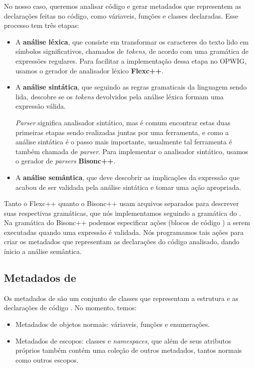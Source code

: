   No nosso caso, queremos analisar código \CXX{} e gerar metadados que representem as declarações feitas no
  código, como váriaveis, funções e classes declaradas. Esse processo tem três etapas:
  \begin{itemize}
    \item A \textbf{análise léxica}, que consiste em transformar os caracteres do texto lido em símbolos 
      significativos, chamados de \textit{tokens}, de acordo com uma gramática de expressões regulares. 
      Para facilitar a implementação dessa etapa no OPWIG, usamos o gerador de analisador léxico
      \textbf{Flexc++}\cite{flex:00}.
      
    \item A \textbf{análise sintática}, que seguindo as regras gramaticais da linguagem sendo lida, 
      descobre se os \textit{tokens} devolvidos pela análise léxica formam uma expressão válida.
      
      \textit{Parser} significa analisador sintático, mas é comum encontrar estas duas primeiras etapas sendo
      realizadas juntas por uma ferramenta, e como a análise sintática é o passo mais importante, usualmente
      tal ferramenta é também chamada de \textit{parser}. Para implementar o analisador sintático,
      usamos o gerador de \textit{parsers} \textbf{Bisonc++}\cite{bison:00}.
      
    \item A \textbf{análise semântica}, que deve descobrir as implicações da expressão que acabou de ser
      validada pela análise sintática e tomar uma ação apropriada.
  \end{itemize}
  
  Tanto o Flexc++ quanto o Bisonc++ usam arquivos separados para descrever suas respectivas gramáticas, que
  nós implementamos seguindo a gramática do \CXX{}. Na gramática do Bisonc++ podemos especificar ações
  (blocos de código \CXX{}) a serem executadas quando uma expressão é validada. Nós programamos tais ações
  para criar os metadados que representam as declarações do código \CXX{} analisado, dando ínicio a 
  análise semântica.
  
  \subsection{Metadados de \CXX{}}
  Os metadados de \CXX{} são um conjunto de classes que representam a estrutura e as declarações de
  código \CXX{}. No momento, temos:
  \begin{itemize}
    \item Metadados de objetos normais: váriaveis, funções e enumerações.
    \item Metadados de escopos: classes e \textit{namespaces}, que além de seus atributos próprios
      também contém uma coleção de outros metadados, tantos normais como outros escopos.
  \end{itemize}
  
